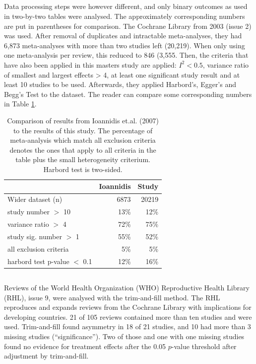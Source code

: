 \documentclass[11pt,a4paper,twoside]{book}\usepackage[]{graphicx}\usepackage[]{color}
\begin{document}
\subsection{\citealp{Ioannidis2007}}
Data processing steps were however different, and only binary outcomes as used in two-by-two tables were analysed. The approximately corresponding numbers are put in parentheses for comparison. The Cochrane Library from 2003 (issue 2) was used. After removal of duplicates and intractable meta-analyses, they had 6,873 meta-analyses with more than two studies left (20,219). When only using one meta-analysis per review, this reduced to 846 (3,555. Then, the criteria that have also been applied in this masters study are applied: $I^2 < 0.5$, variance ratio of smallest and largest effects > 4, at least one significant study result and at least 10 studies to be used. Afterwards, they applied Harbord's, Egger's and Begg's Test to the dataset. The reader can compare some corresponding numbers in Table \ref{ioannidis}.

\begin{table}[ht]
\centering
\begin{tabular}{lrr}
  \hline
 & Ioannidis & Study \\ 
  \hline
Wider dataset (n) & 6873 & 20219 \\ 
  study number $>$ 10 & 13\% & 12\% \\ 
  variance ratio $>$ 4 & 72\% & 75\% \\ 
  study sig. number $>$ 1 & 55\% & 52\% \\ 
  all exclusion criteria & 5\% & 5\% \\ 
  harbord test p-value $<$ 0.1 & 12\% & 16\% \\ 
   \hline
\end{tabular}
\caption{Comparison of results from Ioannidis et.al. (2007) to the results of this study. The percentage of meta-analysis which match all exclusion criteria denotes the ones that apply to all criteria in the table plus the small heterogeneity criterium. Harbord test is two-sided.} 
\label{ioannidis}
\end{table}


\subsection{\citealp{souza.2007}}
Reviews of the World Health Organization (WHO) Reproductive Health Library (RHL), issue 9, were analysed with the trim-and-fill method. The RHL reproduces and expands reviews from the Cochrane Library with implications for developing countries. 21 of 105 reviews contained more than ten studies and were used. Trim-and-fill found asymmetry in 18 of 21 studies, and 10 had more than 3 missing studies (``significance''). Two of those and one with one missing studies found no evidence for treatment effects after the 0.05 $p$-value threshold after adjustment by trim-and-fill.
\end{document}
